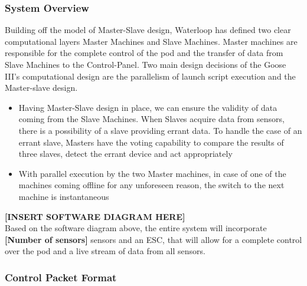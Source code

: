 \documentclass[main.tex]{subfile}
\begin{document}
    \subsubsection{System Overview}
    Building off the model of Master-Slave design, Waterloop has defined two clear computational layers Master Machines and Slave Machines. Master machines are responsible for the complete control of the pod and the transfer of data from Slave Machines to the Control-Panel. Two main design decisions of the Goose III’s computational design are the parallelism of launch script execution and the Master-slave design.
    \begin{itemize}
        \item Having Master-Slave design in place, we can ensure the validity of data coming from the Slave Machines. When Slaves acquire data from sensors, there is a possibility of a slave providing errant data. To handle the case of an errant slave, Masters have the voting capability to compare the results of three slaves, detect the errant device and act appropriately
        \item With parallel execution by the two Master machines, in case of one of the machines coming offline for any unforeseen reason, the switch to the next machine is instantaneous
    \end{itemize}
    \textbf{[INSERT SOFTWARE DIAGRAM HERE]}\\
    Based on the software diagram above, the entire system will incorporate \textbf{[Number of sensors]} sensors and an ESC, that will allow for a complete control over the pod and a live stream of data from all sensors.
    \subsubsection{Control Packet Format}
\end{document}
